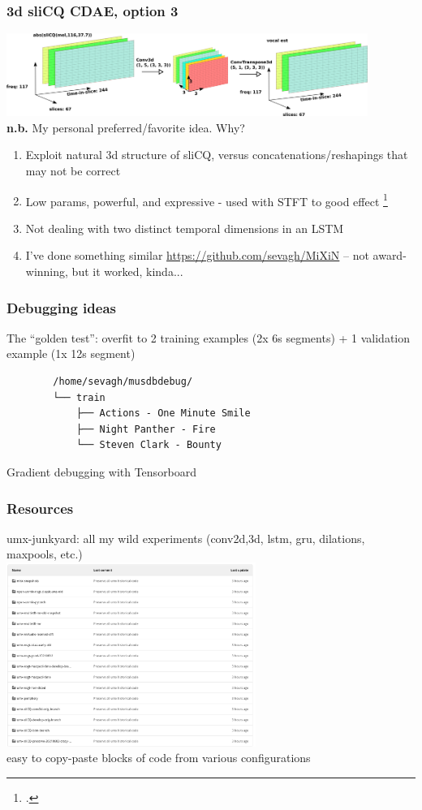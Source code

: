 \documentclass[usenames,dvipsnames]{beamer}
\begin{document}
\begin{frame}
	\frametitle{3d sliCQ CDAE, option 3}
	\includegraphics[height=2.7cm]{./umxslicqcdae.png}\\
	\textbf{n.b.} My personal preferred/favorite idea. Why?
	\begin{enumerate}
		\item
			Exploit natural 3d structure of sliCQ, versus concatenations/reshapings that may not be correct
		\item
			Low params, powerful, and expressive - used with STFT to good effect \footcite{plumbley1, plumbley2}
		\item
			Not dealing with two distinct temporal dimensions in an LSTM
		\item
			I've done something similar \href{https://github.com/sevagh/MiXiN}{https://github.com/sevagh/MiXiN} -- not award-winning, but it worked, kinda...
	\end{enumerate}
\end{frame}

\begin{frame}[fragile]
	\frametitle{Debugging ideas}
	The ``golden test'': overfit to 2 training examples (2x 6s segments) + 1 validation example (1x 12s segment)
	\begin{verbatim}
        /home/sevagh/musdbdebug/
        └── train
            ├── Actions - One Minute Smile
            ├── Night Panther - Fire
            └── Steven Clark - Bounty
	\end{verbatim}
	Gradient debugging with Tensorboard
\end{frame}

\begin{frame}
	\frametitle{Resources}
	umx-junkyard: all my wild experiments (conv2d,3d, lstm, gru, dilations, maxpools, etc.)\\
	\includegraphics[height=6cm]{./junkyard.png}\\
	easy to copy-paste blocks of code from various configurations
\end{frame}
\end{document}
